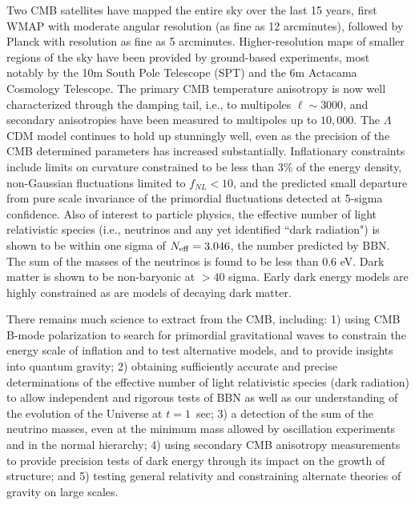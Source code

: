 Two CMB satellites have mapped the entire sky over the last 15 years, first WMAP with moderate angular resolution (as fine as 12 arcminutes), followed by Planck with resolution as fine as 5 arcminutes. Higher-resolution maps of smaller regions of the sky have been provided by ground-based experiments, most notably by the 10m South Pole Telescope (SPT) and the 6m Actacama Cosmology Telescope. The primary CMB temperature anisotropy is now well characterized through the damping tail, i.e., to multipoles $\ell \sim 3000$, and secondary anisotropies have been measured to multipoles up to  $10,000$.   The $\Lambda$CDM model continues to hold up stunningly well, even as the precision of the CMB determined parameters has increased substantially. Inflationary constraints include limits on curvature constrained to be less than 3\% of the energy density, non-Gaussian fluctuations limited to $f_{NL} < 10$, and 
the predicted small departure from pure scale invariance of the primordial fluctuations detected at 5-sigma confidence. Also of interest to particle physics, the effective number of light relativistic species (i.e., neutrinos and any yet identified ``dark radiation") is shown to be within one sigma of $N_\mathrm{eff} = 3.046$, the number predicted by BBN.  The sum of the masses of the neutrinos is found to be less than 0.6 eV. Dark matter is shown to be non-baryonic at $> 40$ sigma. Early dark energy models are highly constrained as are models of decaying dark matter. 

There remains much science to extract from the CMB, including: 1) using CMB B-mode polarization to search for primordial gravitational waves to constrain the energy scale of inflation and to test alternative models, and to provide insights into quantum gravity; 2) obtaining sufficiently accurate and precise determinations of the effective number of light relativistic species (dark radiation) to allow independent and rigorous tests of BBN as well as our understanding of the evolution of the Universe at $t = 1$\ sec; 3) a detection of the sum of the neutrino masses, even at the minimum mass allowed by oscillation experiments and in the normal hierarchy; 4) using secondary CMB anisotropy measurements to provide precision tests of dark energy through its impact on the growth of structure; and 5) testing general relativity and constraining alternate theories of gravity on large scales.

